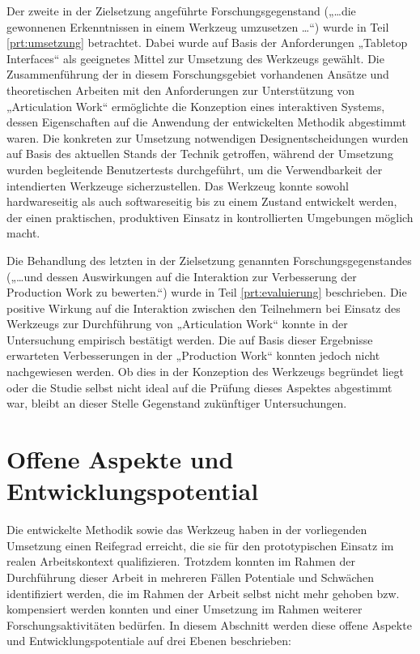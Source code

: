 Der zweite in der Zielsetzung angeführte Forschungsgegenstand („\ldots die gewonnenen Erkenntnissen in einem Werkzeug umzusetzen \ldots“) wurde in Teil \ref{prt:umsetzung} betrachtet. Dabei wurde auf Basis der Anforderungen  „Tabletop Interfaces“ als geeignetes Mittel zur Umsetzung des Werkzeugs gewählt. Die Zusammenführung der in diesem Forschungsgebiet vorhandenen Ansätze und theoretischen Arbeiten mit den Anforderungen zur Unterstützung von „Articulation Work“ ermöglichte die Konzeption eines interaktiven Systems, dessen Eigenschaften auf die Anwendung der entwickelten Methodik abgestimmt waren. Die konkreten zur Umsetzung notwendigen Designentscheidungen wurden auf Basis des aktuellen Stands der Technik getroffen, während der Umsetzung wurden begleitende Benutzertests durchgeführt, um die Verwendbarkeit der intendierten Werkzeuge sicherzustellen. Das Werkzeug konnte sowohl hardwareseitig als auch softwareseitig bis zu einem Zustand entwickelt werden, der einen praktischen, produktiven Einsatz in kontrollierten Umgebungen möglich macht.

Die Behandlung des letzten in der Zielsetzung genannten Forschungsgegenstandes („\ldots und dessen Auswirkungen auf die Interaktion zur Verbesserung der Production Work zu bewerten.“) wurde in Teil \ref{prt:evaluierung} beschrieben. Die positive Wirkung auf die Interaktion zwischen den Teilnehmern bei Einsatz des Werkzeugs zur Durchführung von „Articulation Work“ konnte in der Untersuchung empirisch bestätigt werden. Die auf Basis dieser Ergebnisse erwarteten Verbesserungen in der „Production Work“ konnten jedoch nicht nachgewiesen werden. Ob dies in der Konzeption des Werkzeugs begründet liegt oder die Studie selbst nicht ideal auf die Prüfung dieses Aspektes abgestimmt war, bleibt an dieser Stelle Gegenstand zukünftiger Untersuchungen.


\section{Offene Aspekte und Entwicklungspotential}
\label{sec:offene_aspekte_und_entwicklungspotential}

Die entwickelte Methodik sowie das Werkzeug haben in der vorliegenden Umsetzung einen Reifegrad erreicht, die sie für den prototypischen Einsatz im realen Arbeitskontext qualifizieren. Trotzdem konnten im Rahmen der Durchführung dieser Arbeit in mehreren Fällen Potentiale und Schwächen identifiziert werden, die im Rahmen der Arbeit selbst nicht mehr gehoben bzw. kompensiert werden konnten und einer Umsetzung im Rahmen weiterer Forschungsaktivitäten bedürfen. In diesem Abschnitt werden diese offene Aspekte und Entwicklungspotentiale auf drei Ebenen beschrieben:

